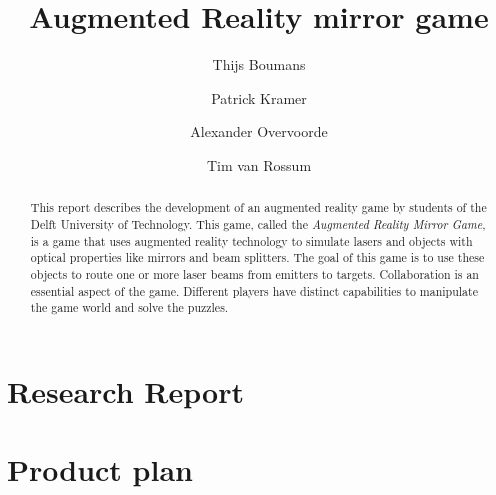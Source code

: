 \documentclass[]{report}
\title{Augmented Reality mirror game}
\author{Thijs Boumans \and Patrick Kramer \and
        Alexander Overvoorde \and Tim van Rossum}
\begin{document}
\maketitle

\begin{abstract}
This report describes the development of an augmented reality game
by students of the Delft University of Technology. This game, called the \emph{Augmented Reality Mirror Game},
is a game that uses augmented reality technology to simulate lasers and objects with optical properties like mirrors and beam splitters. The goal of this game is to use these objects to route one or more laser beams from emitters to targets. Collaboration is an essential aspect of the game. Different players have distinct capabilities to manipulate the game world and solve the puzzles.
\end{abstract}
\tableofcontents
\listoffigures







\appendix

\chapter{Research Report} \label{app:researchreport}





\chapter{Product plan} \label{app:productplan}









\pagebreak
{}

\end{document}
